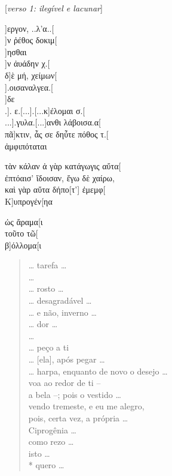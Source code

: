 \begin{gkverse}

\textnormal{[\textit{verso 1: ilegível e lacunar}]}

]εργον, ..λ’α..[\\
  ]ν ῤέθος δοκιμ[\\
    ]ησθαι\\
]ν ἀυάδην χ.[\\
δ]ὲ μή, χείμων[\\
  ].οισαναλγεα.[\\
  ]δε\\
.]. ε.[...].[...κ]έλομαι σ.[\\
...].γυλα.[...]ανθι λάβοισα.α[\\
πᾶ]κτιν, ἆς σε δηὖτε πόθος τ.[\\
ἀμφιπόταται

τὰν κάλαν ἀ γὰρ κατάγωγις αὔτα[\\
ἐπτόαισ’ ἴδοισαν, ἔγω δὲ χαίρω,\\
καὶ γὰρ αὔτα δήπο[τ’] ἐμεμφ[\\
Κ]υπρογέν[ηα

ὠς ἄραμα[ι\\
τοῦτο τῶ[\\
β]όλλομα[ι

\end{gkverse}


\begin{verse}
\ldots{} tarefa \ldots{}\\
\ldots{}\\ 
\ldots{}  rosto \ldots{}\\  
\ldots{}  desagradável \ldots{}\\
\ldots{}  e não, inverno \ldots{}\\
\ldots{}  dor \ldots{}\\
\ldots{}\\ 
\ldots{}  peço a ti\\
\ldots{}  [ela], após pegar \ldots{}\\
\ldots{} harpa, enquanto de novo o desejo \ldots{}\\
voa ao redor de ti --\\
a bela --; pois o vestido \ldots{}\\
vendo tremeste, e eu me alegro,\\
pois, certa vez, a própria \ldots{} \\
Ciprogênia \ldots{}\\
como rezo \ldots{}\\
isto \ldots{}\\*
quero \ldots{}\\
\end{verse}

